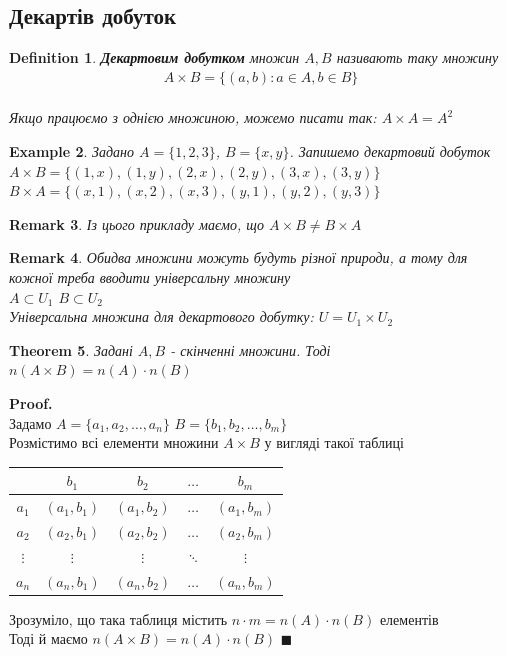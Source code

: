 \documentclass[a4paper, 14pt]{extarticle}
\theoremstyle{theoremdd}
\newtheorem{theorem}{Theorem}[subsection]
\theoremstyle{theoremdd}
\newtheorem{definition}[theorem]{Definition}
\theoremstyle{theoremdd}
\theoremstyle{theoremdd}
\newtheorem{example}[theorem]{Example}
\theoremstyle{theoremdd}
\theoremstyle{theoremdd}
\newtheorem{remark}[theorem]{Remark}
\theoremstyle{theoremdd}
\theoremstyle{theoremdd}
\newenvironment{pf}{\vspace*{-3mm} \textbf{Proof. \\}}{$\blacksquare$}
\begin{document}
\subsection{Декартів добуток}
\begin{definition}
\textbf{Декартовим добутком} множин $A,B$ називають таку множину
\begin{align*}
A \times B = \{(a,b): a \in A, b \in B\}
\end{align*}\\
Якщо працюємо з однією множиною, можемо писати так: $A \times A = A^2$
\end{definition}

\begin{example}
Задано $A = \{1,2,3\}$, $B = \{x,y\}$. Запишемо декартовий добуток\\
$A \times B = \{(1,x),(1,y),(2,x),(2,y),(3,x),(3,y)\}$\\
$B \times A = \{(x,1),(x,2),(x,3),(y,1),(y,2),(y,3)\}$
\end{example}

\begin{remark}
Із цього прикладу маємо, що $A \times B \neq B \times A$
\end{remark}

\begin{remark}
Обидва множини можуть будуть різної природи, а тому для кожної треба вводити універсальну множину\\
$A \subset U_1$ \hspace{1cm} $B \subset U_2$\\
Універсальна множина для декартового добутку: $U = U_1 \times U_2$
\end{remark}

\begin{theorem}
Задані $A,B$ - скінченні множини. Тоді\\
$n(A \times B) = n(A) \cdot n(B)$
\end{theorem}

\begin{pf}
Задамо $A = \{a_1,a_2,\dots,a_n\}$ \hspace{0.5cm} $B = \{b_1,b_2,\dots,b_m\}$\\
Розмістимо всі елементи множини $A \times B$ у вигляді такої таблиці\\
\begin{center}
\begin{tabular}{c|cccc}
$ $ & $b_1$ & $b_2$ & $\dots$ & $b_m$ \\
\hline
$a_1$ & $(a_1,b_1)$ & $(a_1,b_2)$ & $\dots$ & $(a_1,b_m)$ \\
$a_2$ & $(a_2,b_1)$ & $(a_2,b_2)$ & $\dots$ & $(a_2,b_m)$ \\
$\vdots$ & $\vdots$ & $\vdots$ & $\ddots$ & $\vdots$ \\
$a_n$ & $(a_n,b_1)$ & $(a_n,b_2)$ & $\dots$ & $(a_n,b_m)$
\end{tabular}
\end{center}
Зрозуміло, що така таблиця містить $n \cdot m = n(A) \cdot n(B)$ елементів\\
Тоді й маємо $n(A \times B) = n(A) \cdot n(B)$
\end{pf}
\end{document}

